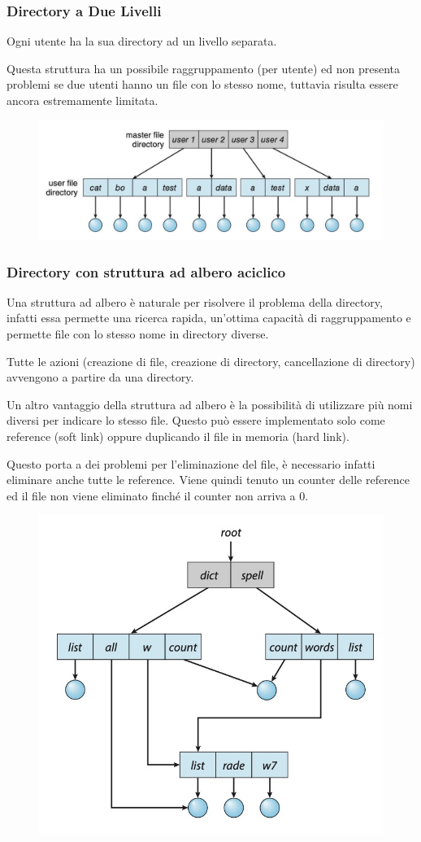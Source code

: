 \subsubsection*{Directory a Due Livelli}
Ogni utente ha la sua directory ad un livello separata.

Questa struttura ha un possibile raggruppamento (per utente) ed non presenta problemi se due utenti hanno un file con lo stesso nome, tuttavia risulta essere ancora estremamente limitata.

\begin{figure}[H]
    \centering
    \includegraphics[width=0.5\linewidth]{assets/directory-2-livelli.jpg}
\end{figure}

\subsubsection*{Directory con struttura ad albero aciclico}
Una struttura ad albero è naturale per risolvere il problema della directory, infatti essa permette una ricerca rapida, un'ottima capacità di raggruppamento e permette file con lo stesso nome in directory diverse.

\spacer
Tutte le azioni (creazione di file, creazione di directory, cancellazione di directory) avvengono a partire da una directory.

\spacer
Un altro vantaggio della struttura ad albero è la possibilità di utilizzare più nomi diversi per indicare lo stesso file.
Questo può essere implementato solo come reference (soft link) oppure duplicando il file in memoria (hard link).

Questo porta a dei problemi per l'eliminazione del file, è necessario infatti eliminare anche tutte le reference. Viene quindi tenuto un counter delle reference ed il file non viene eliminato finché il counter non arriva a 0.

\begin{figure}[H]
    \centering
    \includegraphics[width=0.42\linewidth]{assets/directory-albero-aciclico.jpg}
\end{figure}

